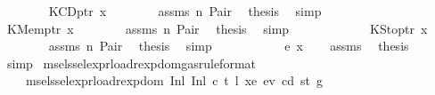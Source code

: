 \begin{isabellebody}
\isanewline
\ \ \ \ \ \ \isamarkupfalse%
\ {\isacharparenleft}{\kern0pt}KCDptr\ x{}{\isacharparenright}{\kern0pt}\isanewline
\ \ \ \ \ \ \isamarkupfalse%
\ assms\ n\ Pair\ \isamarkupfalse%
\ {\isacharquery}{\kern0pt}thesis\ \isamarkupfalse%
\ simp\isanewline
\ \ \ \ \isamarkupfalse%
\isanewline
\ \ \ \ \ \ \isamarkupfalse%
\ {\isacharparenleft}{\kern0pt}KMemptr\ x{}{\isacharparenright}{\kern0pt}\isanewline
\ \ \ \ \ \ \isamarkupfalse%
\ assms\ n\ Pair\ \isamarkupfalse%
\ {\isacharquery}{\kern0pt}thesis\ \isamarkupfalse%
\ simp\isanewline
\ \ \ \ \isamarkupfalse%
\isanewline
\ \ \ \ \ \ \isamarkupfalse%
\ {\isacharparenleft}{\kern0pt}KStoptr\ x{}{\isacharparenright}{\kern0pt}\isanewline
\ \ \ \ \ \ \isamarkupfalse%
\ assms\ n\ Pair\ \isamarkupfalse%
\ {\isacharquery}{\kern0pt}thesis\ \isamarkupfalse%
\ simp\isanewline
\ \ \ \ \isamarkupfalse%
\isanewline
\ \ \isamarkupfalse%
\isanewline
{}\isamarkupfalse%
\isanewline
\ \ \isamarkupfalse%
\ {\isacharparenleft}{\kern0pt}e\ x{\isacharparenright}{\kern0pt}\isanewline
\ \ \isamarkupfalse%
\ assms\ \isamarkupfalse%
\ {\isacharquery}{\kern0pt}thesis\ \isamarkupfalse%
\ simp\isanewline
{}\isamarkupfalse%
%
\endisatagproof
{\isafoldproof}%
%
\isadelimproof
\isanewline
%
\endisadelimproof
\isanewline
{}\isamarkupfalse%
\ msel{\isacharunderscore}{\kern0pt}ssel{\isacharunderscore}{\kern0pt}expr{\isacharunderscore}{\kern0pt}load{\isacharunderscore}{\kern0pt}rexp{\isacharunderscore}{\kern0pt}dom{\isacharunderscore}{\kern0pt}gas{\isacharbrackleft}{\kern0pt}rule{\isacharunderscore}{\kern0pt}format{\isacharbrackright}{\kern0pt}{\isacharcolon}{\kern0pt}\isanewline
\ \ \ \ {\isachardoublequoteopen}msel{\isacharunderscore}{\kern0pt}ssel{\isacharunderscore}{\kern0pt}expr{\isacharunderscore}{\kern0pt}load{\isacharunderscore}{\kern0pt}rexp{\isacharunderscore}{\kern0pt}dom\ {\isacharparenleft}{\kern0pt}Inl\ {\isacharparenleft}{\kern0pt}Inl\ {\isacharparenleft}{\kern0pt}c{}{\isacharcomma}{\kern0pt}\ t{}{\isacharcomma}{\kern0pt}\ l{}{\isacharcomma}{\kern0pt}\ xe{}{\isacharcomma}{\kern0pt}\ ev{}{\isacharcomma}{\kern0pt}\ cd{}{\isacharcomma}{\kern0pt}\ st{}{\isacharcomma}{\kern0pt}\ g{}{\isacharparenright}{\kern0pt}{\isacharparenright}{\kern0pt}{\isacharparenright}{\kern0pt}\isanewline

\end{isabellebody}

